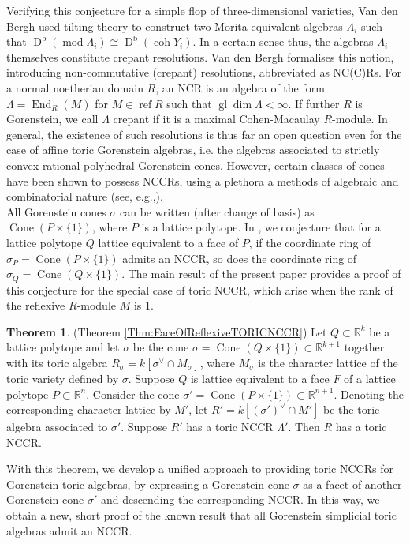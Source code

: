 \documentclass[reqno, 12pt]{amsart}
\theoremstyle{definition}
\newtheorem*{theorem*}{Theorem}
\numberwithin{equation}{section}
\newcommand{\newterm}{\textsf}
\newcommand{\dbcoh}[1]{\operatorname{D}^{\operatorname{b}}(\operatorname{coh }#1)}
\newcommand{\dbmod}[1]{\operatorname{D}^{\operatorname{b}}(\operatorname{mod }#1)}
\newcommand{\R}{\mathbb{R}}
\newcommand{\End}{\operatorname{End}}
\newcommand{\gldim}{\operatorname{gl}\dim}
\newcommand{\cone}{\operatorname{Cone}}
\begin{document}
Verifying this conjecture for a simple flop of three-dimensional varieties, Van den Bergh \cite{VdB3Dflops} used tilting theory to construct two Morita equivalent algebras $\Lambda_i$ such that $\dbmod{\Lambda_i}\cong \dbcoh{Y_i}$. In a certain sense thus, the algebras $\Lambda_i$ themselves constitute crepant resolutions. Van den Bergh \cite{VdB04} formalises this notion, introducing \newterm{non-commutative (crepant) resolutions}, abbreviated as NC(C)Rs. For a normal noetherian domain $R$, an NCR is an algebra of the form $\Lambda=\End_R(M)$ for $M\in \operatorname{ref} R$ such that $\gldim\Lambda<\infty$. If further $R$ is Gorenstein, we call $\Lambda$ crepant if it is a maximal Cohen-Macaulay $R$-module. In general, the existence of such resolutions is thus far an open question even for the case of affine toric Gorenstein algebras, i.e. the algebras associated to strictly convex rational polyhedral Gorenstein cones. However, certain classes of cones have been shown to possess NCCRs, using a plethora a methods of algebraic and combinatorial nature (see, e.g.,\cite{Broomhead, svdbt2, FMS19,Tomo25}). \\
All Gorenstein cones $\sigma$ can be written (after change of basis) as $\cone(P\times\{1\})$, where $P$ is a lattice polytope. In \cite{MS25}, we conjecture that for a lattice polytope $Q$ lattice equivalent to a face of $P$, if the coordinate ring of $\sigma_P=\cone(P\times \{1\})$ admits an NCCR, so does the coordinate ring of $\sigma_Q=\cone(Q\times\{1\})$. The main result of the present paper provides a proof of this conjecture for the special case of \newterm{toric} NCCR, which arise when the rank of the reflexive $R$-module $M$ is 1.

\begin{theorem*}(Theorem \ref{Thm:FaceOfReflexiveTORICNCCR})
    Let $Q\subset \R^k$ be a lattice polytope and let $\sigma$ be the cone $\sigma=\cone(Q\times\{1\})\subset \R^{k+1}$ together with its toric algebra $R_\sigma=k[\sigma^\vee\cap M_\sigma]$, where $M_\sigma$ is the character lattice of the toric variety defined by $\sigma$. Suppose $Q$ is lattice equivalent to a face $F$ of a lattice polytope $P\subset \R^n$. Consider the cone $\sigma'=\cone(P\times\{1\})\subset\R^{n+1}$. Denoting the corresponding character lattice by $M'$, let $R'=k[(\sigma')^\vee\cap M']$ be the toric algebra associated to $\sigma'$. Suppose $R'$ has a toric NCCR $\Lambda'$. Then $R$ has a toric NCCR.
\end{theorem*}

With this theorem, we develop a unified approach to providing toric NCCRs for Gorenstein toric algebras, by expressing a Gorenstein cone $\sigma$ as a facet of another Gorenstein cone $\sigma'$ and descending the corresponding NCCR. 
In this way, we obtain a new, short proof of the known result that all Gorenstein simplicial toric algebras admit an NCCR.
\end{document}
